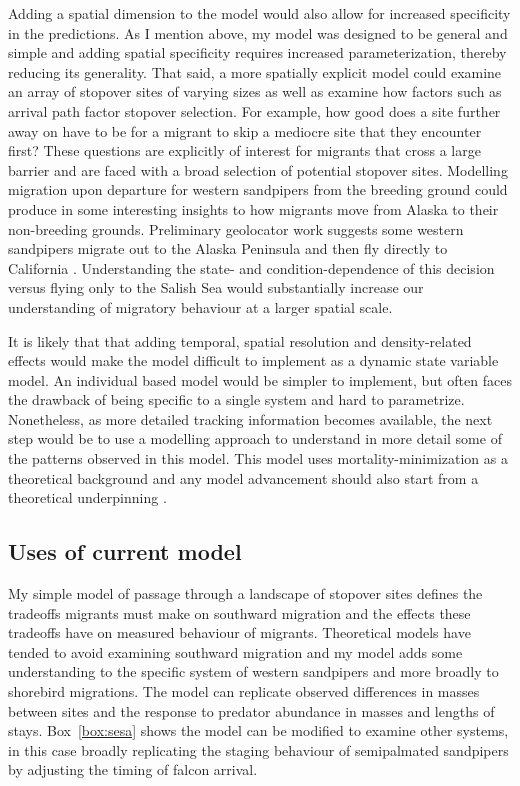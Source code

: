 Adding a spatial dimension to the model would also allow for increased specificity in the predictions. As I mention above, my model was designed to be general and simple and adding spatial specificity requires increased parameterization, thereby reducing its generality. That said, a more spatially explicit model could examine an array of stopover sites of varying sizes as well as examine how factors such as arrival path factor stopover selection. For example, how good does a site further away on have to be for a migrant to skip a mediocre site that they encounter first? These questions are explicitly of interest for migrants that cross a large barrier and are faced with a broad selection of potential stopover sites. Modelling migration upon departure for western sandpipers from the breeding ground could produce in some interesting insights to how migrants move from Alaska to their non-breeding grounds. Preliminary geolocator work suggests some western sandpipers migrate out to the Alaska Peninsula and then fly directly to California \citep{north2016state}. Understanding the state- and condition-dependence of this decision versus flying only to the Salish Sea would substantially increase our understanding of migratory behaviour at a larger spatial scale.

It is likely that that adding temporal, spatial resolution and density-related effects would make the model difficult to implement as a dynamic state variable model. An individual based model would be simpler to implement, but often faces the drawback of being specific to a single system and hard to parametrize. Nonetheless, as more detailed tracking information becomes available, the next step would be to use a modelling approach to understand in more detail some of the patterns observed in this model. This model uses mortality-minimization as a theoretical background and any model advancement should also start from a theoretical underpinning \citep{Grimm2005}.

\subsection*{Uses of current model}


My simple model of passage through a landscape of stopover sites defines the tradeoffs migrants must make on southward migration and the effects these tradeoffs have on measured behaviour of migrants. Theoretical models have tended to avoid examining southward migration and my model adds some understanding to the specific system of western sandpipers and more broadly to shorebird migrations. The model can replicate observed differences in masses between sites and the response to predator abundance in masses and lengths of stays.  Box~\ref{box:sesa} shows the model can be modified to examine other systems, in this case broadly replicating the staging behaviour of semipalmated sandpipers by adjusting the timing of falcon arrival.


